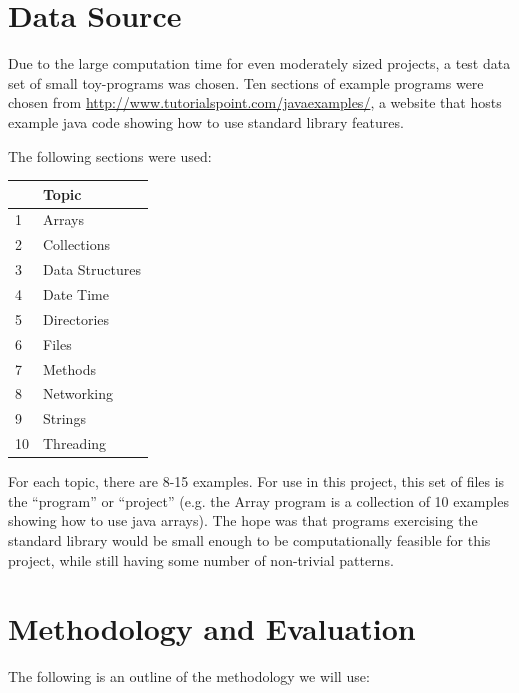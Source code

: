 \documentclass[12pt]{article}
\begin{document}
\section{Data Source}
Due to the large computation time for even moderately sized projects, a test data set of small toy-programs was chosen. Ten sections of example programs were chosen from \url{http://www.tutorialspoint.com/javaexamples/}, a website that hosts example java code showing how to use standard library features.

\noindent The following sections were used:
\begin{table}[ht]
\begin{tabular}{@{}ll@{}}
\toprule
   & Topic           \\ \midrule
1  & Arrays          \\
2  & Collections     \\
3  & Data Structures \\
4  & Date Time       \\
5  & Directories     \\
6  & Files           \\
7  & Methods         \\
8  & Networking      \\
9  & Strings         \\
10 & Threading       \\ \bottomrule
\end{tabular}
\end{table}

\noindent For each topic, there are 8-15 examples. For use in this project, this set of files is the ``program'' or ``project'' (e.g. the Array program is a collection of 10 examples showing how to use java arrays). The hope was that programs exercising the standard library would be small enough to be computationally feasible for this project, while still having some number of non-trivial patterns.

\section{Methodology and Evaluation}
The following is an outline of the methodology we will use:
\end{document}
